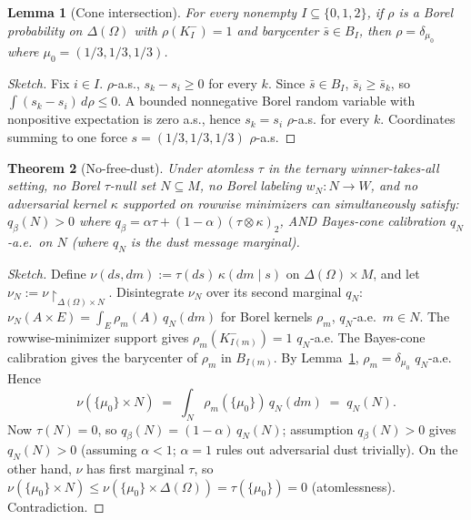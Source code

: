 \documentclass[11pt]{article}
\newtheorem{theorem}{Theorem}
\newtheorem{lemma}[theorem]{Lemma}
\theoremstyle{definition}
\theoremstyle{remark}
\newcommand{\Om}{\Omega}
\begin{document}
\begin{lemma}[Cone intersection]\label{lem:cone}
For every nonempty $I\subseteq\{0,1,2\}$, if $\rho$ is a Borel
probability on $\Delta(\Om)$ with $\rho(K_I^-) = 1$ and barycenter
$\bar s\in B_I$, then $\rho = \delta_{\mu_0}$ where $\mu_0 = (1/3,
1/3, 1/3)$.
\end{lemma}

\begin{proof}[Sketch]
Fix $i\in I$. $\rho$-a.s., $s_k - s_i \ge 0$ for every $k$. Since
$\bar s\in B_I$, $\bar s_i\ge \bar s_k$, so $\int(s_k - s_i)\,d\rho
\le 0$. A bounded nonnegative Borel random variable with nonpositive
expectation is zero a.s., hence $s_k = s_i$ $\rho$-a.s. for every
$k$. Coordinates summing to one force $s = (1/3, 1/3, 1/3)$
$\rho$-a.s.
\end{proof}

\begin{theorem}[No-free-dust]\label{thm:nofreedust}
Under atomless $\tau$ in the ternary winner-takes-all setting, no
Borel $\tau$-null set $N\subseteq M$, no Borel labeling $w_N: N\to W$,
and no adversarial kernel $\kappa$ supported on rowwise minimizers
can simultaneously satisfy: $q_\beta(N) > 0$ where
$q_\beta = \alpha\tau + (1-\alpha)(\tau\otimes\kappa)_2$, AND
Bayes-cone calibration $q_N$-a.e.\ on $N$ (where $q_N$ is the dust
message marginal).
\end{theorem}

\begin{proof}[Sketch]
Define $\nu(ds, dm) := \tau(ds)\,\kappa(dm\mid s)$ on
$\Delta(\Om)\times M$, and let $\nu_N := \nu\!\restriction_{\Delta(\Om)\times N}$.
Disintegrate $\nu_N$ over its second marginal $q_N$: $\nu_N(A\times E) =
\int_E\rho_m(A)\,q_N(dm)$ for Borel kernels $\rho_m$, $q_N$-a.e.\ $m\in N$.
The rowwise-minimizer support gives $\rho_m(K_{I(m)}^-) = 1$ $q_N$-a.e.
The Bayes-cone calibration gives the barycenter of $\rho_m$ in
$B_{I(m)}$. By Lemma~\ref{lem:cone}, $\rho_m = \delta_{\mu_0}$ $q_N$-a.e.
Hence
\[
  \nu(\{\mu_0\}\times N) \;=\; \int_N\rho_m(\{\mu_0\})\,q_N(dm) \;=\; q_N(N).
\]
Now $\tau(N) = 0$, so $q_\beta(N) = (1-\alpha)\,q_N(N)$; assumption
$q_\beta(N) > 0$ gives $q_N(N) > 0$ (assuming $\alpha < 1$; $\alpha = 1$
rules out adversarial dust trivially). On the other hand, $\nu$ has
first marginal $\tau$, so
$\nu(\{\mu_0\}\times N) \le \nu(\{\mu_0\}\times\Delta(\Om)) = \tau(\{\mu_0\}) = 0$
(atomlessness). Contradiction.
\end{proof}
\end{document}
